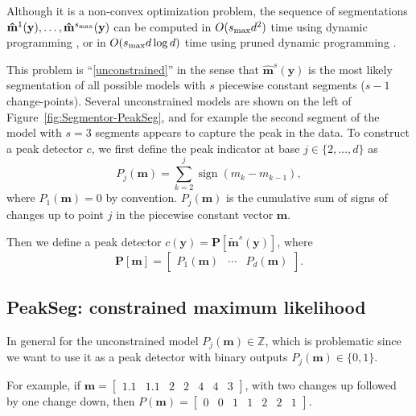 \documentclass{article}
\DeclareMathOperator*{\sign}{sign}
\newcommand{\ZZ}{\mathbb Z}
\begin{document}
Although it is a non-convex optimization problem, the sequence of
segmentations $\mathbf{\hat m}^1(\mathbf y), \dots, \mathbf{\hat
  m}^{s_{\text{\text{max}}}}(\mathbf y)$ can be computed in
$O(s_{\text{\text{max}}} d^2)$ time using dynamic programming
\citep{bellman}, or in $O(s_{\text{\text{max}}} d \log d)$
time using pruned dynamic programming \citep{pruned-dp, Segmentor}.

This problem is ``\ref{unconstrained}'' in the sense that
$\mathbf{\hat m}^s(\mathbf y)$ is the most likely segmentation of all
possible models with $s$ piecewise constant segments ($s-1$
change-points). Several unconstrained models are shown on the left of
Figure~\ref{fig:Segmentor-PeakSeg}, and for example the second segment of the
model with $s=3$ segments appears to capture the peak in the data.
To construct a peak detector $c$, we first define the peak indicator at base
$j\in\{2, \dots, d\}$ as
\begin{equation}
  \label{eq:peaks}
  P_j(\mathbf m) = \sum_{k=2}^j \sign( m_{k} - m_{k-1} ),
\end{equation}
where $P_1(\mathbf m)=0$ by convention. $P_j(\mathbf m)$ is the
cumulative sum of signs of changes up to point $j$ in the piecewise constant
vector $\mathbf m$. 

Then we define a peak detector $c(\mathbf y) = \mathbf P\left[
  \mathbf{\tilde m}^s(\mathbf y) \right]$, where
\begin{equation}
  \mathbf
P[\mathbf m] = \left[\begin{array}{ccc} P_1(\mathbf m) & \cdots &
    P_d(\mathbf m)
\end{array}\right].
\end{equation}

\subsection{PeakSeg: constrained maximum likelihood}
\label{sec:constrained}

In general for the unconstrained model $P_j(\mathbf m)\in\ZZ$, which
is problematic since we want to use it as a peak detector with binary
outputs $P_j(\mathbf m)\in \{0, 1\}$. 

For example, if $\mathbf m = \left[\begin{array}{ccccccc}1.1 &
    1.1 & 2 & 2 & 4 & 4 & 3\end{array}\right]$, with two changes up
followed by one change down, then $P(\mathbf m) =
\left[\begin{array}{ccccccc}0 & 0 & 1 & 1 & 2 & 2 &
    1 \end{array}\right]$.
\end{document}
